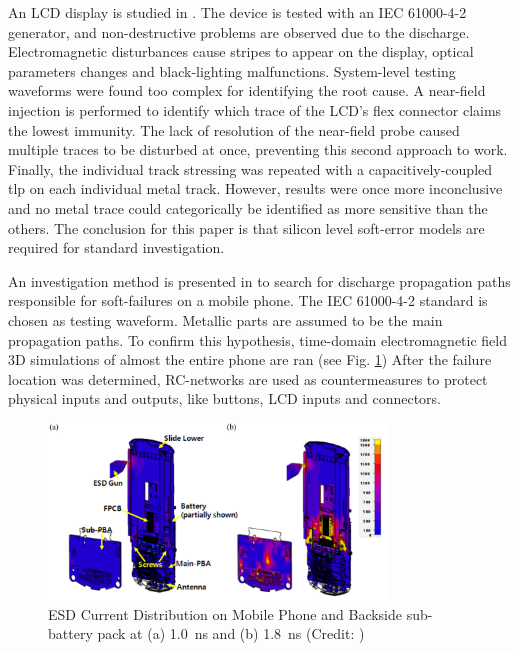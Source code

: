 An LCD display is studied in \cite{softFailLCD}.
The device is tested with an IEC 61000-4-2 \cite{iec61000-4-2} generator, and non-destructive problems are observed due to the discharge.
Electromagnetic disturbances cause stripes to appear on the display, optical parameters changes and black-lighting malfunctions.
System-level testing waveforms were found too complex for identifying the root cause.
A near-field injection is performed to identify which trace of the LCD's flex connector claims the lowest immunity.
The lack of resolution of the near-field probe caused multiple traces to be disturbed at once, preventing this second approach to work.
Finally, the individual track stressing was repeated with a capacitively-coupled \gls{tlp} on each individual metal track.
However, results were once more inconclusive and no metal trace could categorically be identified as more sensitive than the others.
The conclusion for this paper is that silicon level soft-error models are required for standard investigation.

An investigation method is presented in \cite{softFailMobile} to search for discharge propagation paths responsible for soft-failures on a mobile phone.
The IEC 61000-4-2 standard is chosen as testing waveform.
Metallic parts are assumed to be the main propagation paths.
To confirm this hypothesis, time-domain electromagnetic field 3D simulations of almost the entire phone are ran (see Fig. \ref{fig:mobile-phone-3d-em})
After the failure location was determined, RC-networks are used as countermeasures to protect physical inputs and outputs, like buttons, LCD inputs and connectors.

\begin{figure}[!h]
  \centering
  \includegraphics[width=0.8\textwidth]{src/1/figures/current_distribution_mobile.png}
  \caption{ESD Current Distribution on Mobile Phone and Backside sub-battery pack at (a) \SI{1.0}{\nano\second} and (b) \SI{1.8}{\nano\second} (Credit: \cite{softFailMobile})}
  \label{fig:mobile-phone-3d-em}
\end{figure}

